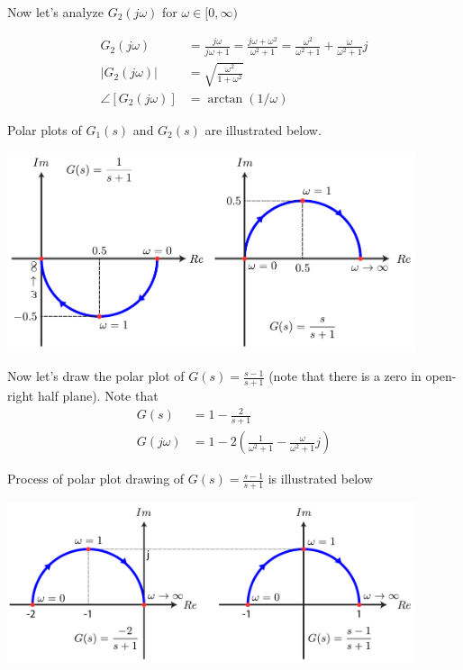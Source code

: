 \documentclass[twoside]{article}
\begin{document}
Now let's analyze $G_2(j \omega)$ for $\omega \in [0 , \infty)$

\begin{align*}
 G_2(j \omega) &= \frac{j \omega}{j \omega +1} = \frac{j \omega + \omega^2}{\omega^2 +1} 
= \frac{\omega^2}{\omega^2 +1} + \frac{\omega}{\omega^2 +1} j
\\
| G_2(j \omega) | &= \sqrt{ \frac{ \omega^2 }{ 1 + \omega^2 } }
\\
\angle [ G_2(j \omega) ] &= \arctan (1 / \omega) 
\end{align*}

Polar plots of $G_1(s)$ and $G_2(s)$ are illustrated below. 

\vspace{6 pt}

  \begin{minipage}[h]{1\linewidth}
    \begin{center}
      \includegraphics[width=0.9\textwidth]{polar2}
    \end{center}
  \end{minipage}

\vspace{6 pt}

Now let's draw the polar plot of  $G(s) = \frac{s - 1}{s+1}$ (note that
there is a zero in open-right half plane). Note that 
%
\begin{align*}
  G(s) &= 1 - \frac{2}{s+1}
  \\
  G(j \omega) &= 1 - 2 \left( \frac{1}{\omega^2 +1} - \frac{\omega}{\omega^2 +1} j \right)
\end{align*}

Process of polar plot drawing of $G(s) = \frac{s - 1}{s+1}$ is illustrated
below

\vspace{6 pt}

  \begin{minipage}[h]{1\linewidth}
    \begin{center}
      \includegraphics[width=0.9\textwidth]{polar3}
    \end{center}
  \end{minipage}
\end{document}
